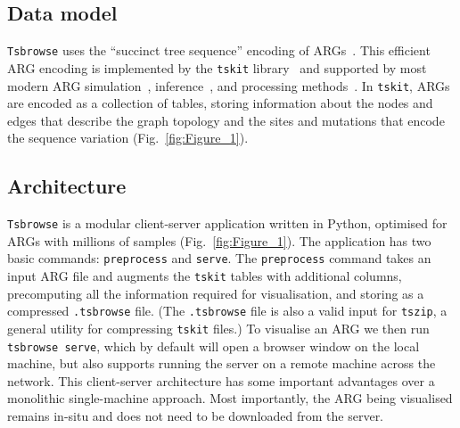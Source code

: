 \documentclass[unnumsec,webpdf,contemporary,large,namedate]{oup-authoring-template}%
\begin{document}
\subsection{Data model} \label{subsec:Data_Model} 
\texttt{Tsbrowse} uses the ``succinct tree sequence'' encoding of 
ARGs~\citep{wong2024general}. This efficient ARG encoding 
is implemented by the 
\texttt{tskit} library~\citep{ralph2020efficiently}
and supported by most modern ARG
simulation~\citep{kelleher2016efficient,kelleher2018efficient,
    haller2019tree,baumdicker2022efficient,
    adrion2020community,lauterbur2023expanding,korfmann2023weak,
    tsambos2023link,tagami2024tstrait},
inference~\citep{kelleher2019inferring,speidel2019method,wohns2022unified,
    mahmoudi2022bayesian,zhan2023towards,zhang2023biobank,deng2025general},
and processing methods~\citep{fan2022genealogical,nowbandegani2023extremely}.
In \texttt{tskit}, ARGs are encoded as a
collection of tables, storing information about the
nodes and edges that describe the graph topology and the sites
and mutations that encode the sequence variation (Fig.~\ref{fig:Figure_1}).

\subsection{Architecture}
\texttt{Tsbrowse} is a modular client-server application
written in Python, optimised for ARGs with millions
of samples (Fig.~\ref{fig:Figure_1}).
The application has two basic commands: \texttt{preprocess}
and \texttt{serve}. The \texttt{preprocess} command
takes an input ARG file and augments the \texttt{tskit}
tables with additional columns,
precomputing all the information required for visualisation,
and storing as a compressed \texttt{.tsbrowse} file.
(The \texttt{.tsbrowse} file is also a valid input for
\texttt{tszip}, a general utility for compressing \texttt{tskit}
files.)
To visualise an ARG we then run \texttt{tsbrowse serve}, which
by default will open a browser window on the local machine, but
also supports running the server on a remote machine across the
network.
This client-server architecture has some important advantages over
a monolithic single-machine approach. Most importantly,
the ARG being visualised remains in-situ and does not need to be
downloaded from the server.
\end{document}
